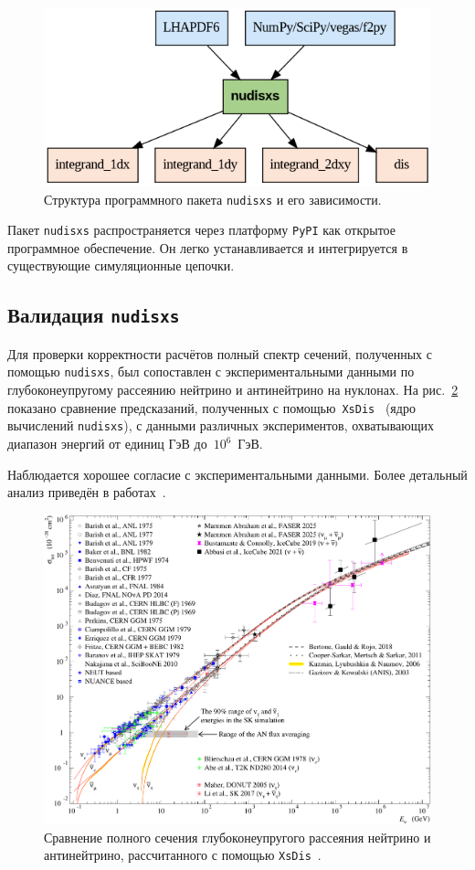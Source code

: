 \begin{figure}[!h]
\centering
\includegraphics[width=0.8\linewidth]{images/nudisxs_diagram.png}
\caption{Структура программного пакета \texttt{nudisxs} и его зависимости.}
\label{fig:nudisxs1}
\end{figure}

Пакет \texttt{nudisxs} распространяется через платформу \texttt{PyPI} как открытое программное обеспечение. 
Он легко устанавливается и интегрируется в существующие симуляционные цепочки. 

\subsection{Валидация \texttt{nudisxs}}

Для проверки корректности расчётов полный спектр сечений, полученных с помощью \texttt{nudisxs}, был сопоставлен с экспериментальными данными по глубоконеупругому рассеянию нейтрино и антинейтрино на нуклонах. 
На рис.~\ref{fig:disxs_compare} показано сравнение предсказаний, полученных с помощью~\texttt{XsDis}~\cite{kuzmin2006_finetuning,kuzmin2005_sumcc,kuzmin2006_axialmass} (ядро вычислений \texttt{nudisxs}), с данными различных экспериментов, охватывающих диапазон энергий от единиц ГэВ до~$10^6$~ГэВ.

Наблюдается хорошее согласие с экспериментальными данными. Более детальный анализ приведён в работах~\cite{kuzmin2006_finetuning,kuzmin2005_sumcc,kuzmin2006_axialmass}.

\begin{figure}[!h]
\centering
\includegraphics[width=0.8\linewidth]{images/dis_vs_data.pdf}
\caption{Сравнение полного сечения глубоконеупругого рассеяния нейтрино и антинейтрино, рассчитанного с помощью \texttt{XsDis}~\cite{kuzmin2006_finetuning,kuzmin2005_sumcc,kuzmin2006_axialmass}.}
\label{fig:disxs_compare}
\end{figure}

